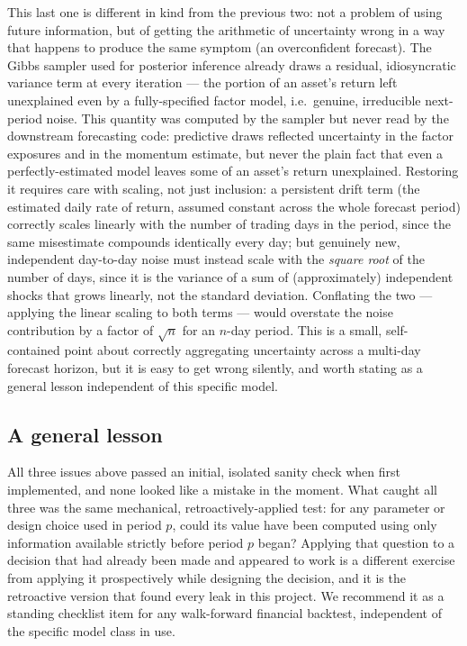 \documentclass[11pt]{article}
\begin{document}
This last one is different in kind from the previous two: not a problem of
using future information, but of getting the arithmetic of uncertainty wrong
in a way that happens to produce the same symptom (an overconfident forecast).
The Gibbs sampler used for posterior inference already draws a residual,
idiosyncratic variance term at every iteration --- the portion of an asset's
return left unexplained even by a fully-specified factor model, i.e.\ genuine,
irreducible next-period noise. This quantity was computed by the sampler but
never read by the downstream forecasting code: predictive draws reflected
uncertainty in the factor exposures and in the momentum estimate, but never
the plain fact that even a perfectly-estimated model leaves some of an asset's
return unexplained. Restoring it requires care with scaling, not just
inclusion: a persistent drift term (the estimated daily rate of return,
assumed constant across the whole forecast period) correctly scales linearly
with the number of trading days in the period, since the same misestimate
compounds identically every day; but genuinely new, independent day-to-day
noise must instead scale with the \emph{square root} of the number of days,
since it is the variance of a sum of (approximately) independent shocks that
grows linearly, not the standard deviation. Conflating the two --- applying
the linear scaling to both terms --- would overstate the noise contribution by
a factor of $\sqrt{n}$ for an $n$-day period. This is a small, self-contained
point about correctly aggregating uncertainty across a multi-day forecast
horizon, but it is easy to get wrong silently, and worth stating as a general
lesson independent of this specific model.

\subsection{A general lesson}

All three issues above passed an initial, isolated sanity check when first
implemented, and none looked like a mistake in the moment. What caught all
three was the same mechanical, retroactively-applied test: for any parameter
or design choice used in period $p$, could its value have been computed using
only information available strictly before period $p$ began? Applying that
question to a decision that had already been made and appeared to work is a
different exercise from applying it prospectively while designing the
decision, and it is the retroactive version that found every leak in this
project. We recommend it as a standing checklist item for any walk-forward
financial backtest, independent of the specific model class in use.
\end{document}
